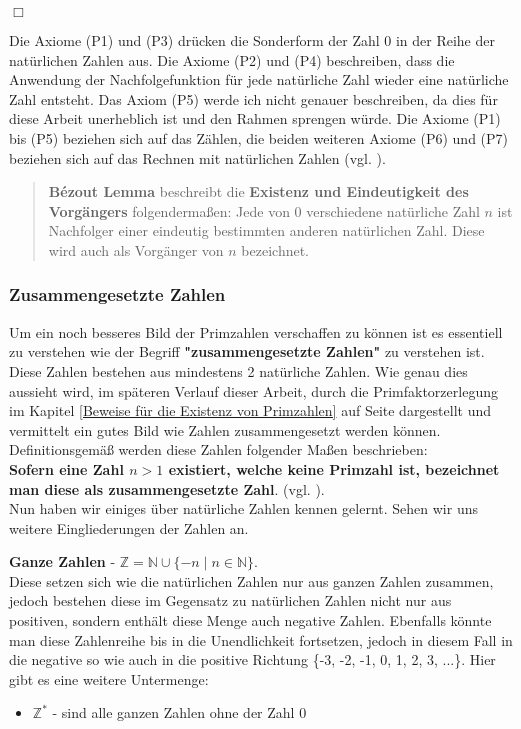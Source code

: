 \documentclass[german,12pt,a4paper]{article}
\begin{document}
\begin{flushright}
$\Box$
\end{flushright}
Die Axiome (P1) und (P3) drücken die Sonderform der Zahl 0 in der Reihe der natürlichen Zahlen aus.
Die Axiome (P2) und (P4) beschreiben, dass die Anwendung der Nachfolgefunktion für jede natürliche Zahl wieder eine natürliche Zahl entsteht.
Das Axiom (P5) werde ich nicht genauer beschreiben, da dies für diese Arbeit unerheblich ist und den Rahmen sprengen würde.
Die Axiome (P1) bis (P5) beziehen sich auf das Zählen, die beiden weiteren Axiome (P6) und (P7) beziehen sich auf das Rechnen mit natürlichen Zahlen (vgl. \cite[84--85]{Steffen2013}).

\begin{quote}
\small
\textbf{Bézout Lemma} beschreibt die \textbf{Existenz und Eindeutigkeit des Vorgängers} folgendermaßen:\newline
Jede von 0 verschiedene natürliche Zahl $n$ ist Nachfolger einer eindeutig bestimmten anderen natürlichen Zahl. Diese wird auch als Vorgänger von $n$ bezeichnet.\newline
\autocite[85]{Steffen2013}
\end{quote}

\subsubsection{Zusammengesetzte Zahlen}\label{Zusammengesetzte Zahlen}
Um ein noch besseres Bild der Primzahlen verschaffen zu können ist es essentiell zu verstehen wie der Begriff \textbf{"{zusammengesetzte Zahlen}"} zu verstehen ist.
Diese Zahlen bestehen aus mindestens 2 natürliche Zahlen.
Wie genau dies aussieht wird, im späteren Verlauf dieser Arbeit, durch die Primfaktorzerlegung im Kapitel \ref{Beweise für die Existenz von Primzahlen} auf Seite \pageref{Primfaktorzerlegung} dargestellt und vermittelt ein gutes Bild wie Zahlen zusammengesetzt werden können.
Definitionsgemäß werden diese Zahlen folgender Maßen beschrieben:\\
\textbf{Sofern eine Zahl $n > 1$ existiert, welche keine Primzahl ist, bezeichnet man diese als zusammengesetzte Zahl}.
(vgl. \cite[13]{RempeGillen2009}).\\

Nun haben wir einiges über natürliche Zahlen kennen gelernt. Sehen wir uns weitere Eingliederungen der Zahlen an.

\textbf{Ganze Zahlen} - $\mathbb{Z} = \mathbb{N} \cup \{-n \mid n \in \mathbb{N}\}$.\\
Diese setzen sich wie die natürlichen Zahlen nur aus ganzen Zahlen zusammen, jedoch bestehen diese im Gegensatz zu natürlichen Zahlen nicht nur aus positiven, sondern enthält diese Menge auch negative Zahlen.
Ebenfalls könnte man diese Zahlenreihe bis in die Unendlichkeit fortsetzen, jedoch in diesem Fall in die negative so wie auch in die positive Richtung \{-3, -2, -1, 0, 1, 2, 3, ...\}.
Hier gibt es eine weitere Untermenge:
\begin{itemize}
\item $\mathbb{Z}^*$ - sind alle ganzen Zahlen ohne der Zahl 0
\end{itemize}
\end{document}
